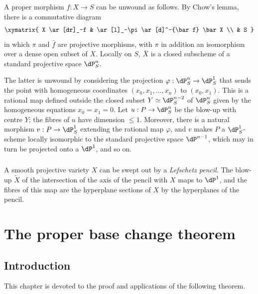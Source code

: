 \subsubsection{}\label{I:3-4-3}

A proper morphism $f:X\to S$ can be unwound as follows. By Chow's lemma,
there is a commutative diagram
\[\xymatrix{
  X \ar[dr]_-f
    & \ar[l]_-\pi \ar[d]^-{\bar f} \bar X \\
  & S
}\]
in which $\pi$ and $\bar f$ are projective morphisms, with $\pi$ in
addition an isomorphism over a dense open subset of $X$. Locally on
$S$, $\bar X$ is a closed subscheme of a standard projective space
$\dP_S^n$.

The latter is unwound by considering the projection
$\varphi:\dP_S^n\to\dP_S^1$ that sends the point with homogeneous
coordinates $(x_0,x_1,\dotsc,x_n)$ to $(x_0,x_1)$. This is a rational
map defined outside the closed subset $Y\simeq\dP_S^{n-2}$ of
$\dP_S^n$ given by the homogeneous equations $x_0=x_1=0$. Let
$u:P\to\dP_S^n$ be the blow-up with centre $Y$; the fibres of $u$ have
dimension $\leqslant1$. Moreover, there is a natural morphism
$v:P\to\dP_S^1$ extending the rational map $\varphi$, and $v$ makes
$P$ a $\dP_S^1$-scheme locally isomorphic to the standard projective
space $\dP^{n-1}$, which may in turn be projected onto a $\dP^1$, and
so on.

\subsubsection{}\label{I:3-4-4}

A smooth projective variety $X$ can be swept out by a
\emph{Lefschetz pencil}. The blow-up $\widetilde X$ of the intersection
of the axis of the pencil with $X$ maps to $\dP^1$, and the fibres of
this map are the hyperplane sections of $X$ by the hyperplanes of the
pencil.

\section{The proper base change theorem}\label{I:4}

\subsection{Introduction}\label{I:4-1}

This chapter is devoted to the proof and applications of the following
theorem.


